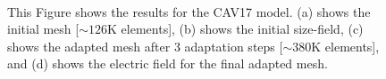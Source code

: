 \documentclass[review,12pt]{elsarticle_summary_report}
\begin{document}
\begin{landscape}
\begin{figure}[ph!]
\centering
{}
\hspace*{50pt}
\\
\hspace*{50pt}
\caption{\label{cav} This Figure shows the results for the CAV17 model. (a) shows the initial mesh [$\sim126\text{K}$ elements], (b) shows the initial size-field, (c) shows the adapted mesh after 3 adaptation steps [$\sim380\text{K}$ elements], and (d) shows the electric field for the final adapted mesh.}
\end{figure}
\end{landscape}
\end{document}
